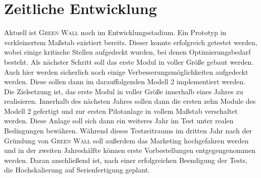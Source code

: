 \chapter{Zeitliche Entwicklung}

    Aktuell ist \textsc{Green Wall} noch im Entwicklungsstadium.
    Ein Prototyp in verkleinertem Maßstab existiert bereits.
    Dieser konnte erfolgreich getestet werden, wobei einige kritische Stellen aufgedeckt wurden, bei denen Optimierungsbedarf besteht.
    Als nächster Schritt soll das erste Modul in voller Größe gebaut werden.
    Auch hier werden sicherlich noch einige Verbesserungsmöglichkeiten aufgedeckt werden.
    Diese sollen dann im darauffolgenden Modell 2 implementiert werden.
    Die Zielsetzung ist, das erste Modul in voller Größe innerhalb eines Jahres zu realisieren.
    Innerhalb des nächsten Jahres sollen dann die ersten zehn Module des Modell 2 gefertigt und zur ersten Pilotanlage in vollem Maßstab verschaltet werden.
    Diese Anlage soll sich dann ein weiteres Jahr im Test unter realen Bedingungen bewähren.
    Während dieses Testzeitraums im dritten Jahr nach der Gründung von \textsc{Green Wall} soll außerdem das Marketing hochgefahren werden und in der zweiten Jahreshälfte können erste Vorbestellungen entgegengenommen werden.
    Daran anschließend ist, nach einer erfolgreichen Beendigung der Tests, die Hochskalierung auf Serienfertigung geplant.